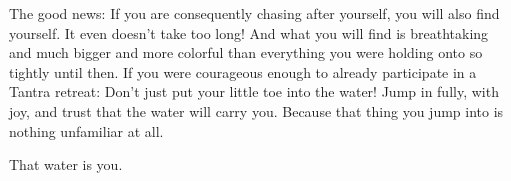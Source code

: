 The good news: If you are consequently chasing after yourself, you will also find yourself. It even doesn't take too long! And what you will find is breathtaking and much bigger and more colorful than everything you were holding onto so tightly until then. If you were courageous enough to already participate in a Tantra retreat: Don't just put your little toe into the water! Jump in fully, with joy, and trust that the water will carry you. Because that thing you jump into is nothing unfamiliar at all.

That water is you.
